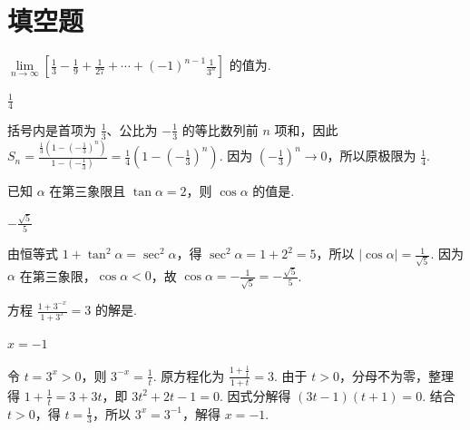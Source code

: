 \documentclass[UTF8,a4paper,oneside,11pt]{ctexbook}
\begin{document}
\section{填空题}

\begin{problem}
\(\displaystyle\lim\limits_{n\to \infty}\left[\frac{1}{3}-\frac{1}{9}+\frac{1}{27}+\cdots+(-1)^{n-1}\frac{1}{3^n}\right]\) 的值为\fillinblank{}.

\begin{answer}
\(\frac{1}{4}\)
\end{answer}

\begin{solution}
括号内是首项为 \(\frac{1}{3}\)、公比为 \(-\frac{1}{3}\) 的等比数列前 \(n\) 项和，因此
\(S_n=\frac{\frac{1}{3}\left(1-\left(-\frac{1}{3}\right)^n\right)}{1-\left(-\frac{1}{3}\right)}=\frac{1}{4}\left(1-\left(-\frac{1}{3}\right)^n\right)\). 因为 \(\left(-\frac{1}{3}\right)^n\to0\)，所以原极限为 \(\frac{1}{4}\).
\end{solution}
\end{problem}

\begin{problem}
已知 \(\alpha\) 在第三象限且 \(\tan \alpha = 2\)，则 \(\cos \alpha\) 的值是\fillinblank{}.

\begin{answer}
\(-\frac{\sqrt{5}}{5}\)
\end{answer}

\begin{solution}
由恒等式 \(1+\tan^2\alpha=\sec^2\alpha\)，得 \(\sec^2\alpha=1+2^2=5\)，所以 \(|\cos\alpha|=\frac{1}{\sqrt{5}}\). 因为 \(\alpha\) 在第三象限，\(\cos\alpha<0\)，故 \(\cos\alpha=-\frac{1}{\sqrt{5}}=-\frac{\sqrt{5}}{5}\).
\end{solution}
\end{problem}

\begin{problem}
方程 \(\frac{1 + 3^{-x}}{1 + 3^x} = 3\) 的解是\fillinblank{}.

\begin{answer}
\(x=-1\)
\end{answer}

\begin{solution}
令 \(t=3^x>0\)，则 \(3^{-x}=\frac{1}{t}\). 原方程化为 \(\frac{1+\frac{1}{t}}{1+t}=3\). 由于 \(t>0\)，分母不为零，整理得 \(1+\frac{1}{t}=3+3t\)，即 \(3t^2+2t-1=0\). 因式分解得 \((3t-1)(t+1)=0\). 结合 \(t>0\)，得 \(t=\frac{1}{3}\)，所以 \(3^x=3^{-1}\)，解得 \(x=-1\).
\end{solution}
\end{problem}
\end{document}
